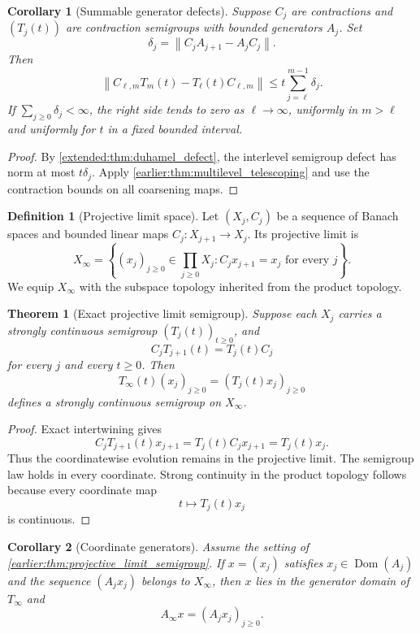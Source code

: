 \documentclass[11pt,letterpaper]{article}
\newtheorem{theorem}{Theorem}[section]
\theoremstyle{plain}
\theoremstyle{plain}
\theoremstyle{plain}
\newtheorem{corollary}[corollary]{Corollary}
\theoremstyle{definition}
\theoremstyle{definition}
\newtheorem{definition}[definition]{Definition}
\theoremstyle{definition}
\theoremstyle{definition}
\theoremstyle{definition}
\theoremstyle{remark}
\theoremstyle{remark}
\theoremstyle{remark}
\theoremstyle{remark}
\theoremstyle{remark}
\newcommand{\norm}[1]{\left\lVert#1\right\rVert}
\theoremstyle{remark}
\begin{document}
\begin{corollary}[Summable generator defects]\label{earlier:record:005}\label{earlier:cor:summable_defects}
Suppose \(C_j\) are contractions and \((T_j(t))\) are contraction semigroups with bounded generators \(A_j\). Set
\[
\delta_j=\norm{C_jA_{j+1}-A_jC_j}.
\]
Then
\[
\norm{C_{\ell,m}T_m(t)-T_\ell(t)C_{\ell,m}}
\leq
 t\sum_{j=\ell}^{m-1}\delta_j.
\]
If \(\sum_{j\geq0}\delta_j<\infty\), the right side tends to zero as \(\ell\to\infty\), uniformly in \(m>\ell\) and uniformly for \(t\) in a fixed bounded interval.
\end{corollary}

\begin{proof}
By \cref{extended:thm:duhamel_defect}, the interlevel semigroup defect has norm at most \(t\delta_j\). Apply \cref{earlier:thm:multilevel_telescoping} and use the contraction bounds on all coarsening maps.
\end{proof}

\begin{definition}[Projective limit space]\label{earlier:record:006}\label{earlier:def:projective_limit}
Let \((X_j,C_j)\) be a sequence of Banach spaces and bounded linear maps \(C_j:X_{j+1}\to X_j\). Its projective limit is
\[
X_\infty
=
\left\{
(x_j)_{j\geq0}\in\prod_{j\geq0}X_j:
C_jx_{j+1}=x_j\text{ for every }j
\right\}.
\]
We equip \(X_\infty\) with the subspace topology inherited from the product topology.
\end{definition}

\begin{theorem}[Exact projective limit semigroup]\label{earlier:record:007}\label{earlier:thm:projective_limit_semigroup}
Suppose each \(X_j\) carries a strongly continuous semigroup \((T_j(t))_{t\geq0}\), and
\[
C_jT_{j+1}(t)=T_j(t)C_j
\]
for every \(j\) and every \(t\geq0\). Then
\[
T_\infty(t)(x_j)_{j\geq0}
=
(T_j(t)x_j)_{j\geq0}
\]
defines a strongly continuous semigroup on \(X_\infty\).
\end{theorem}

\begin{proof}
Exact intertwining gives
\[
C_jT_{j+1}(t)x_{j+1}
=
T_j(t)C_jx_{j+1}
=
T_j(t)x_j.
\]
Thus the coordinatewise evolution remains in the projective limit. The semigroup law holds in every coordinate. Strong continuity in the product topology follows because every coordinate map
\[
t\longmapsto T_j(t)x_j
\]
is continuous.
\end{proof}

\begin{corollary}[Coordinate generators]\label{earlier:record:008}\label{earlier:cor:projective_generators}
Assume the setting of \cref{earlier:thm:projective_limit_semigroup}. If \(x=(x_j)\) satisfies \(x_j\in\operatorname{Dom}(A_j)\) and the sequence \((A_jx_j)\) belongs to \(X_\infty\), then \(x\) lies in the generator domain of \(T_\infty\) and
\[
A_\infty x=(A_jx_j)_{j\geq0}.
\]
\end{corollary}
\end{document}
